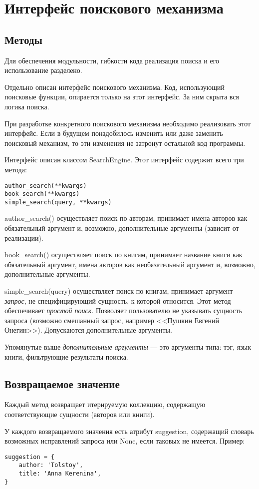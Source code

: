 \section{Интерфейс поискового механизма}

\subsection{Методы}


Для обеспечения модульности, гибкости кода реализация поиска и его использование разделено.

Отдельно описан интерфейс поискового механизма. Код, использующий поисковые функции, опирается только на этот интерфейс. За ним скрыта вся логика поиска.

При разработке конкретного поискового механизма необходимо реализовать этот интерфейс. Если в будущем понадобилось изменить или даже заменить поисковый механизм, то эти изменения не затронут остальной код программы.

Интерфейс описан классом SearchEngine.
Этот интерфейс содержит всего три метода:
\begin{verbatim}
author_search(**kwargs)
book_search(**kwargs)
simple_search(query, **kwargs)
\end{verbatim}


author\_search() осуществляет поиск по авторам, принимает имена авторов как обязательный аргумент и, возможно, дополнительные аргументы (зависит от реализации).

book\_search() осуществляет поиск по книгам, принимает название книги как обязательный аргумент, имена авторов как необязательный аргумент и, возможно, дополнительные аргументы. 

simple\_search(query) осуществляет поиск по книгам, принимает аргумент {\em запрос}, не специфицирующий сущность, к которой относится.
Этот метод обеспечивает {\em простой поиск}.
Позволяет пользователю не указывать сущность запроса (возможно смешанный запрос, например <<Пушкин Евгений Онегин>>). Допускаются дополнительные аргументы. 

Упомянутые выше {\em дополнительные аргументы} --- это аргументы типа: тэг, язык книги, фильтрующие результаты поиска. 


\subsection{Возвращаемое значение}

Каждый метод возвращает итерируемую коллекцию, содержащую соответствующие сущности (авторов или книги). 

У каждого возвращаемого значения есть атрибут suggestion, содержащий словарь возможных исправлений запроса или None, если таковых не имеется. Пример: 
\begin{verbatim}
suggestion = {
    author: 'Tolstoy',
    title: 'Anna Kerenina',
}
\end{verbatim}

